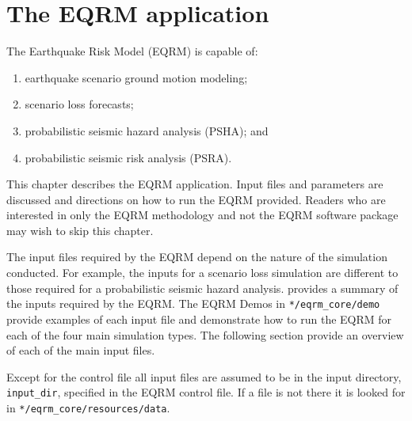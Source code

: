 \chapter{The EQRM application}
\label{ch:application}

The Earthquake Risk Model (EQRM) is capable of:
\begin{enumerate}
\item earthquake scenario ground motion modeling;
\item scenario loss forecasts;
\item probabilistic seismic hazard analysis (PSHA); and
\item  probabilistic seismic risk analysis (PSRA).
\end{enumerate}


This chapter describes the EQRM application. Input files and
parameters are discussed and directions on how to run the EQRM
provided. Readers who are interested in only the EQRM methodology
and not the EQRM software package may wish to skip this chapter.


The input files required by the EQRM depend on the nature of the
simulation conducted. For example, the inputs for a scenario loss
simulation are different to those required for a probabilistic
seismic hazard analysis.  provides a
summary of the inputs required by the EQRM. The EQRM Demos in
\texttt{*/eqrm\_core/demo} provide examples of each input file and
demonstrate how to run the EQRM for each of the four main simulation
types. The following section provide an overview of each of the main
input files.

Except for the control file all input files are assumed to be in the
input directory, \texttt{input\_dir}, specified in the EQRM control
file.  If a file is not there it is looked for in
\texttt{*/eqrm\_core/resources/data}.

